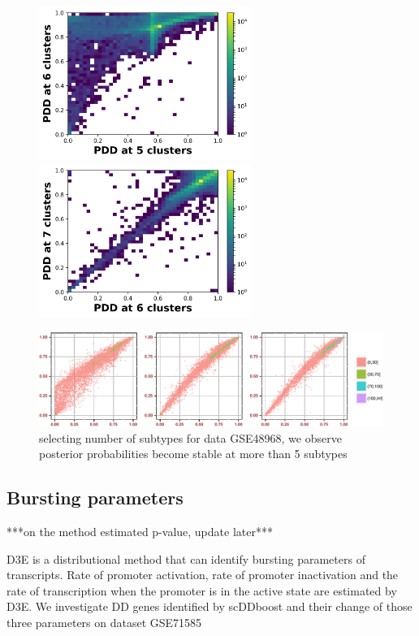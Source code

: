 \documentclass[aoas,preprint]{imsart}
\begin{document}
\begin{figure}[H]



  \includegraphics[height = 5cm, width=\linewidth]{Figs/G48_56.png}
\endminipage\hfill
{}
  \includegraphics[height = 5cm, width=\linewidth]{Figs/G48_67.png}
\endminipage\hfill


\includegraphics[width = 1\textwidth]{Figs/s_789_GSE48968.pdf}

\caption{selecting number of subtypes for data GSE48968, we observe posterior probabilities become stable at more than 5 subtypes}
\end{figure}

\subsection{Bursting parameters}

***on the method estimated p-value, update later***

D3E\citep{ref:d3e} is a distributional method that can identify bursting parameters of transcripts. Rate of promoter activation, rate of promoter inactivation and the rate of transcription when the promoter is in the active state are estimated by D3E.  We investigate DD genes identified by scDDboost and their change of those three parameters on dataset GSE71585\\
\end{document}
